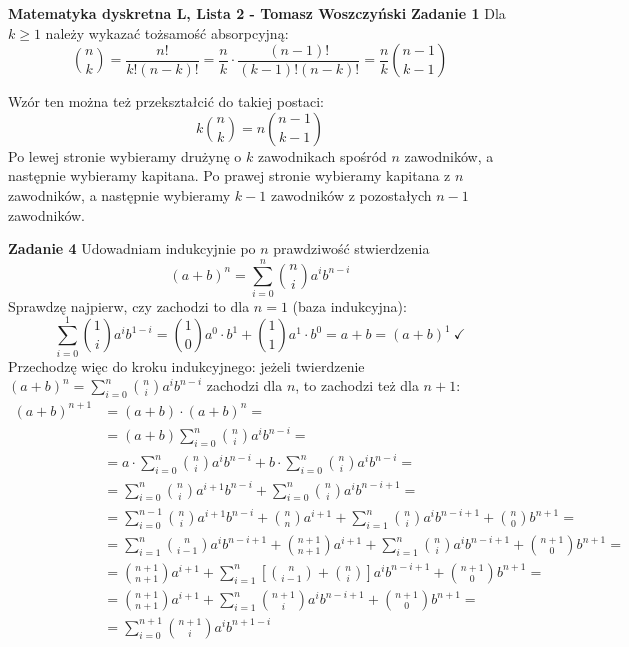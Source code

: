 \documentclass[a4paper,12pt]{article}
\begin{document}
\noindent \textbf{Matematyka dyskretna L, Lista 2 - Tomasz Woszczyński}\newline
\noindent \newline \textbf{Zadanie 1} \newline
Dla $k \geq 1$ należy wykazać tożsamość absorpcyjną:
$$ \binom{n}{k} = \frac{n!}{k!(n-k)!} = \frac{n}{k} \cdot \frac{(n-1)!}{(k-1)!(n-k)!} = \frac{n}{k} \binom{n-1}{k-1}$$

\noindent Wzór ten można też przekształcić do takiej postaci:
$$ k\binom{n}{k} = n \binom{n-1}{k-1} $$
Po lewej stronie wybieramy drużynę o $k$ zawodnikach spośród $n$ zawodników, a następnie wybieramy kapitana. Po prawej stronie wybieramy kapitana z $n$ zawodników, a następnie wybieramy $k-1$ zawodników z pozostałych $n-1$ zawodników.

\noindent \newline \textbf{Zadanie 4} \newline
Udowadniam indukcyjnie po $n$ prawdziwość stwierdzenia 
$$(a+b)^n = \sum\limits_{i=0}^{n}\binom{n}{i}a^{i}b^{n-i}$$
Sprawdzę najpierw, czy zachodzi to dla $n=1$ (baza indukcyjna):
$$ \sum\limits_{i=0}^{1}\binom{1}{i}a^{i}b^{1-i} = \binom{1}{0}a^0\cdot b^1 + \binom{1}{1} a^1\cdot b^0 = a+b = (a+b)^1 \ \checkmark$$
Przechodzę więc do kroku indukcyjnego: jeżeli twierdzenie $(a+b)^n = \sum\limits_{i=0}^{n}\binom{n}{i}a^{i}b^{n-i}$ zachodzi dla $n$, to zachodzi też dla $n+1$:
$$
\begin{aligned}
(a+b)^{n+1} 	&= (a+b)\cdot (a+b)^n = \\
			&= (a+b) \sum\limits_{i=0}^{n}\binom{n}{i}a^{i}b^{n-i} = \\
		  	&= a\cdot \sum\limits_{i=0}^{n}\binom{n}{i}a^{i}b^{n-i} + b\cdot \sum\limits_{i=0}^{n}\binom{n}{i}a^{i}b^{n-i} = \\
		  	&= \sum\limits_{i=0}^{n}\binom{n}{i}a^{i+1}b^{n-i} + \sum\limits_{i=0}^{n}\binom{n}{i}a^{i}b^{n-i+1} = \\
		  	&= \sum\limits_{i=0}^{n-1}\binom{n}{i}a^{i+1}b^{n-i} + \binom{n}{n}a^{i+1} + \sum\limits_{i=1}^{n}\binom{n}{i}a^{i}b^{n-i+1} + \binom{n}{0}b^{n+1} = \\
		  	&= \sum\limits_{i=1}^{n}\binom{n}{i-1}a^{i}b^{n-i+1} + \binom{n+1}{n+1}a^{i+1} + \sum\limits_{i=1}^{n}\binom{n}{i}a^{i}b^{n-i+1} + \binom{n+1}{0}b^{n+1} = \\
		  	&= \binom{n+1}{n+1}a^{i+1} + \sum\limits_{i=1}^{n} \left[\binom{n}{i-1} + \binom{n}{i} \right] a^{i}b^{n-i+1} + \binom{n+1}{0}b^{n+1} = \\
		  	&= \binom{n+1}{n+1}a^{i+1} + \sum\limits_{i=1}^{n} \binom{n+1}{i} a^{i}b^{n-i+1} + \binom{n+1}{0}b^{n+1} = \\
		  	&= \sum\limits_{i=0}^{n+1} \binom{n+1}{i} a^{i} b^{n+1-i}
\end{aligned}
$$
\end{document}
